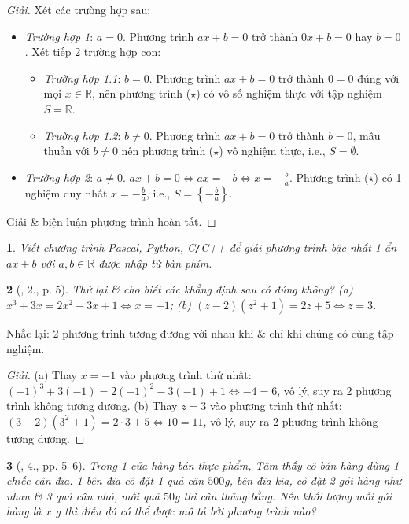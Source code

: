 \documentclass{article}
\newtheorem{baitoan}{}
\begin{document}
\begin{proof}[Giải]
	Xét các trường hợp sau:
	\begin{itemize}
		\item \textit{Trường hợp 1}: $a = 0$. Phương trình $ax + b = 0$ trở thành $0x + b = 0$ hay $b = 0$. Xét tiếp 2 trường hợp con:
		\begin{itemize}
			\item \textit{Trường hợp 1.1}: $b = 0$. Phương trình $ax + b = 0$ trở thành $0 = 0$ đúng với mọi $x\in\mathbb{R}$, nên phương trình ($\star$) có vô số nghiệm thực với tập nghiệm $S = \mathbb{R}$.
			\item \textit{Trường hợp 1.2}: $b\ne0$. Phương trình $ax + b = 0$ trở thành $b = 0$, mâu thuẫn với $b\ne0$ nên phương trình ($\star$) vô nghiệm thực, i.e., $S = \emptyset$.
		\end{itemize}
		\item \textit{Trường hợp 2}: $a\ne0$. $ax + b = 0\Leftrightarrow ax = -b\Leftrightarrow x = -\frac{b}{a}$. Phương trình ($\star$) có 1 nghiệm duy nhất $x = -\frac{b}{a}$, i.e., $S = \left\{-\frac{b}{a}\right\}$.
	\end{itemize}
	Giải \& biện luận phương trình hoàn tất.
\end{proof}

\begin{baitoan}
	Viết chương trình Pascal, Python, C\emph{\texttt{/}}C++ để giải phương trình bậc nhất 1 ẩn $ax + b$ với $a,b\in\mathbb{R}$ được nhập từ bàn phím.
\end{baitoan}

\begin{baitoan}[\cite{SBT_Toan_8_tap_2}, 2., p. 5]
	Thử lại \& cho biết các khẳng định sau có đúng không? (a) $x^3 + 3x = 2x^2 - 3x + 1\Leftrightarrow x = -1$; (b) $(z - 2)(z^2 + 1) = 2z + 5\Leftrightarrow z = 3$.
\end{baitoan}
Nhắc lại: 2 phương trình tương đương với nhau khi \& chỉ khi chúng có cùng tập nghiệm.

\begin{proof}[Giải]
	(a) Thay $x = -1$ vào phương trình thứ nhất: $(-1)^3 + 3(-1) = 2(-1)^2 - 3(-1) + 1\Leftrightarrow-4 = 6$, vô lý, suy ra 2 phương trình không tương đương. (b) Thay $z = 3$ vào phương trình thứ nhất: $(3 - 2)(3^2 + 1) = 2\cdot3 + 5\Leftrightarrow10 = 11$, vô lý, suy ra 2 phương trình không tương đương.
\end{proof}

\begin{baitoan}[\cite{SBT_Toan_8_tap_2}, 4., pp. 5--6]
	Trong 1 cửa hàng bán thực phẩm, Tâm thấy cô bán hàng dùng 1 chiếc cân đĩa. 1 bên đĩa cô đặt 1 quả cân $500$\emph{g}, bên đĩa kia, cô đặt 2 gói hàng như nhau \& 3 quả cân nhỏ, mỗi quả $50$\emph{g} thì cân thăng bằng. Nếu khối lượng mỗi gói hàng là $x$ \emph{g} thì điều đó có thể được mô tả bởi phương trình nào?
\end{baitoan}
\end{document}
